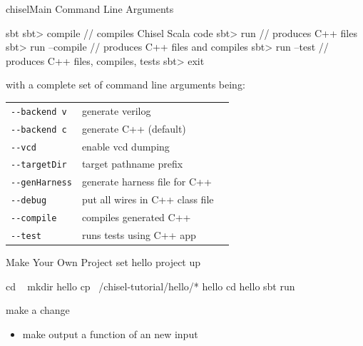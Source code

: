 \documentclass[xcolor=pdflatex,dvipsnames,table]{beamer}
\begin{document}
\begin{frame}[fragile]{chiselMain Command Line Arguments}
\begin{scala}
sbt 
sbt> compile       // compiles Chisel Scala code
sbt> run           // produces C++ files
sbt> run --compile // produces C++ files and compiles
sbt> run --test    // produces C++ files, compiles, tests
sbt> exit
\end{scala}

with a complete set of command line arguments being:\\[2mm]

\begin{tabular}{lll}
\verb+--backend v+ & generate verilog \\
\verb+--backend c+ & generate C++ (default)\\
\verb+--vcd+ & enable vcd dumping \\
\verb+--targetDir+ & target pathname prefix \\
\verb+--genHarness+ & generate harness file for C++ \\
\verb+--debug+ & put all wires in C++ class file \\
\verb+--compile+ & compiles generated C++ \\
\verb+--test+ & runs tests using C++ app \\
\end{tabular}
\end{frame}

\begin{frame}[fragile]{Make Your Own Project}
set hello project up
\begin{bash}
cd ~
mkdir hello
cp ~/chisel-tutorial/hello/* hello
cd hello
sbt run
\end{bash}
make a change
\begin{itemize}
\item make output a function of an new input 
\end{itemize}
\end{frame}
\end{document}
